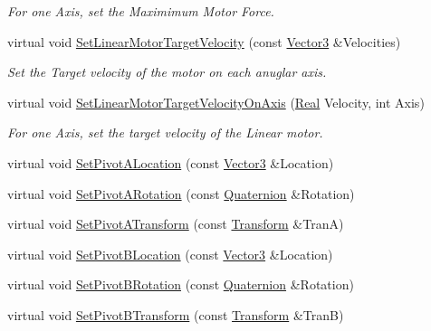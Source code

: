 \begin{DoxyCompactItemize}
\begin{DoxyCompactList}\small\item\em For one Axis, set the Maximimum Motor Force. \item\end{DoxyCompactList}\item 
virtual void \hyperlink{classphys_1_1Generic6DofConstraint_a06f6ab25155bcdf64410c291bbcc0206}{SetLinearMotorTargetVelocity} (const \hyperlink{classphys_1_1Vector3}{Vector3} \&Velocities)
\begin{DoxyCompactList}\small\item\em Set the Target velocity of the motor on each anuglar axis. \item\end{DoxyCompactList}\item 
virtual void \hyperlink{classphys_1_1Generic6DofConstraint_affa823620df06133b71b1bf04cc104a3}{SetLinearMotorTargetVelocityOnAxis} (\hyperlink{namespacephys_af7eb897198d265b8e868f45240230d5f}{Real} Velocity, int Axis)
\begin{DoxyCompactList}\small\item\em For one Axis, set the target velocity of the Linear motor. \item\end{DoxyCompactList}\item 
virtual void \hyperlink{classphys_1_1Generic6DofConstraint_a488cc8ca89d73ddeac7e9928354ca53d}{SetPivotALocation} (const \hyperlink{classphys_1_1Vector3}{Vector3} \&Location)
\item 
virtual void \hyperlink{classphys_1_1Generic6DofConstraint_af02e9aa94cf2bafbbd533372d9b69285}{SetPivotARotation} (const \hyperlink{classphys_1_1Quaternion}{Quaternion} \&Rotation)
\item 
virtual void \hyperlink{classphys_1_1Generic6DofConstraint_a6d6a3e092a98c4e689f001abb28bd3e6}{SetPivotATransform} (const \hyperlink{classphys_1_1Transform}{Transform} \&TranA)
\item 
virtual void \hyperlink{classphys_1_1Generic6DofConstraint_ac5ea8b4e757db0a622df37a334df9ee4}{SetPivotBLocation} (const \hyperlink{classphys_1_1Vector3}{Vector3} \&Location)
\item 
virtual void \hyperlink{classphys_1_1Generic6DofConstraint_a3e5fe94b3035c21ad2a1b55c7f1becb6}{SetPivotBRotation} (const \hyperlink{classphys_1_1Quaternion}{Quaternion} \&Rotation)
\item 
virtual void \hyperlink{classphys_1_1Generic6DofConstraint_a5216ec1b5d67dd12971d58c5aa03a52f}{SetPivotBTransform} (const \hyperlink{classphys_1_1Transform}{Transform} \&TranB)

\end{DoxyCompactItemize}
